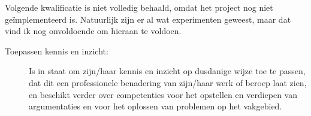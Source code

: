Volgende kwalificatie is niet volledig behaald, omdat het project nog
niet geïmplementeerd is. Natuurlijk zijn er al wat experimenten
geweest, maar dat vind ik nog onvoldoende om hieraan te voldoen.

\begin{description}
	\item[Toepassen kennis en inzicht:] Is in staat om zijn/haar
kennis en inzicht op dusdanige wijze toe te passen, dat dit een
professionele benadering van zijn/haar werk of beroep laat zien, en
beschikt verder over competenties voor het opstellen en verdiepen van
argumentaties en voor het oplossen van problemen op het vakgebied.
\end{description}
